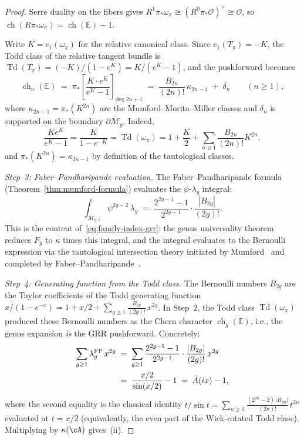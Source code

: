 \begin{proof}
Serre duality on the fibers gives
$R^1\pi_*\omega_\pi \cong (R^0\pi_*\mathcal{O})^\vee \cong \mathcal{O}$,
so $\operatorname{ch}(R\pi_*\omega_\pi) = \operatorname{ch}(\mathbb{E}) - 1$.

Write $K = c_1(\omega_\pi)$ for the relative canonical class.  Since
$c_1(T_\pi) = -K$, the Todd class of the relative tangent bundle is
$\operatorname{Td}(T_\pi) = (-K)/(1 - e^K) = K/(e^K - 1)$, and the
pushforward becomes
\begin{equation}\label{eq:mumford-chern-character}
\operatorname{ch}_n(\mathbb{E})
\;=\;
\pi_*\!\left[
  \frac{K \cdot e^K}{e^K - 1}
\right]_{\text{deg } 2n+1}
\;=\;
\frac{B_{2n}}{(2n)!}\,\kappa_{2n-1}
\;+\; \delta_n
\qquad (n \geq 1),
\end{equation}
where $\kappa_{2n-1} = \pi_*(K^{2n})$ are the
Mumford--Morita--Miller classes \cite{Mumford83}
and $\delta_n$ is supported on the boundary
$\partial\overline{\mathcal{M}}_g$.
Indeed,
\[
\frac{K e^K}{e^K-1}
= \frac{K}{1 - e^{-K}}
= \operatorname{Td}(\omega_\pi)
= 1 + \frac{K}{2} + \sum_{n \geq 1} \frac{B_{2n}}{(2n)!} K^{2n},
\]
and $\pi_*(K^{2n}) = \kappa_{2n-1}$ by definition of the tautological
classes.

\emph{Step~3: Faber--Pandharipande evaluation.}
The Faber--Pandharipande formula
(Theorem~\ref{thm:mumford-formula}) evaluates the
$\psi$-$\lambda_g$ integral:
\[
\int_{\overline{\mathcal{M}}_{g,1}} \psi^{2g-2}\,\lambda_g
\;=\;
\frac{2^{2g-1}-1}{2^{2g-1}} \cdot
\frac{|B_{2g}|}{(2g)!}.
\]
This is the content of~\eqref{eq:family-index-grr}: the genus
universality theorem reduces $F_g$ to $\kappa$ times this
integral, and the integral evaluates to the Bernoulli expression
via the tautological intersection theory initiated by
Mumford~\cite{Mumford83} and completed by
Faber--Pandharipande~\cite{FP00}.

\emph{Step~4: Generating function from the Todd class.}
The Bernoulli numbers $B_{2g}$ are the Taylor coefficients of
the Todd generating function
$x/(1 - e^{-x}) = 1 + x/2 + \sum_{g \geq 1}
\frac{B_{2g}}{(2g)!}\, x^{2g}$.
In Step~2, the Todd class $\operatorname{Td}(\omega_\pi)$
produced these Bernoulli numbers as the Chern character
$\operatorname{ch}_g(\mathbb{E})$, i.e., the genus expansion
\emph{is} the GRR pushforward.
Concretely:
\begin{align}
\sum_{g \geq 1} \lambda_g^{\mathrm{FP}}\, x^{2g}
&\;=\;
\sum_{g \geq 1}
\frac{2^{2g-1}-1}{2^{2g-1}} \cdot
\frac{|B_{2g}|}{(2g)!}\, x^{2g}
\notag \\
&\;=\;
\frac{x/2}{\sin(x/2)} - 1
\;=\; \hat{A}(ix) - 1,
\label{eq:bernoulli-a-hat}
\end{align}
where the second equality is the classical identity
$t/\sin t = \sum_{n \geq 0}
\frac{(2^{2n}-2)\,|B_{2n}|}{(2n)!}\,t^{2n}$
evaluated at $t = x/2$ (equivalently, the even part of
the Wick-rotated Todd class).
Multiplying by $\kappa(\cA)$ gives~(ii).


\end{proof}
